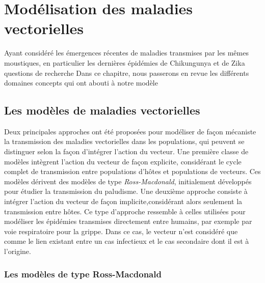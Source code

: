 \chapter{Modélisation des maladies vectorielles}
\chaptermark{}


Ayant considéré les émergences récentes de maladies transmises par les mêmes moustiques, en particulier les dernières épidémies de Chikungunya et de Zika
questions de recherche
Dans ce chapitre, nous passerons en revue les différents domaines concepts qui ont abouti à notre modèle

\section{Les modèles de maladies vectorielles}

Deux principales approches ont été proposées pour modéliser de façon mécaniste la transmission des maladies vectorielles dans les populations, qui peuvent se distinguer selon la façon d'intégrer l'action du vecteur. 
Une première classe de modèles intègrent l'action du vecteur de façon explicite, considérant le cycle complet de transmission entre populations d'hôtes et populations de vecteurs. Ces modèles dérivent des modèles de type {\em Ross-Macdonald}, initialement développés pour étudier la transmission du paludisme.
Une deuxième approche consiste à intégrer l'action du vecteur de façon implicite,considérant alors seulement la transmission entre hôtes. 
Ce type d'approche ressemble à celles utilisées pour modéliser les épidémies transmises directement entre humains, par exemple par voie respiratoire pour la grippe. 
Dans ce cas, le vecteur n'est considéré que comme le lien existant entre un cas infectieux et le cas secondaire dont il est à l'origine.


\subsection{Les modèles de type Ross-Macdonald}

